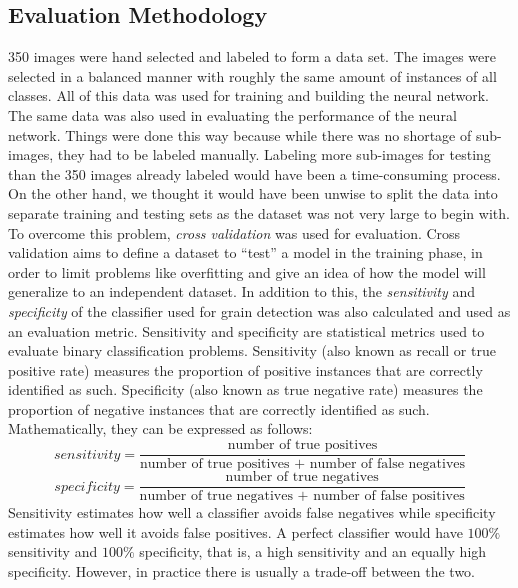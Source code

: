 \subsection{Evaluation Methodology}
350 images were hand selected and labeled to form a data set. The images were selected in a balanced manner with roughly the same amount of instances of all classes. All of this data was used for training and building the neural network. The same data was also used in evaluating the performance of the neural network. Things were done this way because while there was no shortage of sub-images, they had to be labeled manually. Labeling more sub-images for testing than the 350 images already labeled would have been a time-consuming process. On the other hand, we thought it would have been unwise to split the data into separate training and testing sets as the dataset was not very large to begin with. To overcome this problem, \textit{cross validation} was used for evaluation. Cross validation aims to define a dataset to ``test'' a model in the training phase, in order to limit problems like overfitting and give an idea of how the model will generalize to an independent dataset. In addition to this, the \textit{sensitivity} and \textit{specificity} of the classifier used for grain detection was also calculated and used as an evaluation metric. Sensitivity and specificity are statistical metrics used to evaluate binary classification problems. Sensitivity (also known as recall or true positive rate) measures the proportion of positive instances that are correctly identified as such. Specificity (also known as true negative rate) measures the proportion of negative instances that are correctly identified as such. Mathematically, they can be expressed as follows:
\begin{equation}
sensitivity = \frac{\text{number of true positives}}{\text{number of true positives + number of false negatives}} 
\end{equation}
\begin{equation}
specificity = \frac{\text{number of true negatives}}{\text{number of true negatives + number of false positives}} 
\end{equation}
Sensitivity estimates how well a classifier avoids false negatives while specificity estimates how well it avoids false positives. A perfect classifier would have $100\%$ sensitivity and $100\%$ specificity, that is, a high sensitivity and an equally high specificity. However, in practice there is usually a trade-off between the two.



